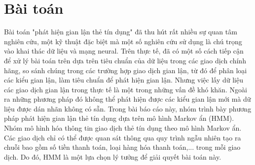 \section{Bài toán}
Bài toán "phát hiện gian lận thẻ tín dụng" đã thu hút rất nhiều sự quan tâm nghiên cứu, một kỹ thuật đặc biệt mà một số nghiên cứu sử dụng là chú trọng vào khai thác dữ liệu và mạng neural. Trên thực tế, đã có một số cách tiếp cận để xử lý bài toán trên dựa trên tiêu chuẩn của dữ liệu trong các giao dịch chính hãng, so sánh chúng trong các trường hợp giao dịch gian lận, từ đó để phân loại các kiểu gian lận, làm tiêu chuẩn để phát hiện gian lận. Nhưng việc lấy dữ liệu các giao dịch gian lận trong thực tế là một trong những vấn đề khó khăn. Ngoài ra những phương pháp đó không thể phát hiện được các kiểu gian lận mới mà dữ liệu được dán nhãn không có sẵn. Trong bài báo cáo này, nhóm trình bày phương pháp phát hiện gian lận thẻ tín dụng dựa trên mô hình Markov ẩn (HMM). Nhóm mô hình hóa thông tin giao dịch thẻ tín dụng theo mô hình Markov ẩn. Các giao dịch chỉ có thể được quan sát thông qua quy trình ngẫu nhiên tạo ra chuỗi bao gồm số tiền thanh toán, loại hàng hóa thanh toán,... trong mỗi giao dịch. Do đó, HMM là một lựa chọn lý tưởng để giải quyết bài toán này.





